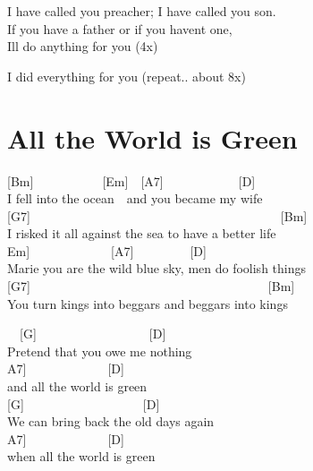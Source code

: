 \documentclass[
  letterpaper,
  a5paper]{memoir}
\begin{document}
I have called you preacher; I have called you son.\\
If you have a father or if you haven\textquotesingle t one,\\
I\textquotesingle ll do anything for you (4x)

I did everything for you (repeat.. about 8x)

\hypertarget{all-the-world-is-green}{%
\chapter{All the World is Green}\label{all-the-world-is-green}}

{[}Bm{]}~~~~~~~~~~~{[}Em{]}~~{[}A7{]}~~~~~~~~~~~~{[}D{]}\\
I fell into the ocean~~and you became my wife\\
{[}G7{]}~~~~~~~~~~~~~~~~~~~~~~~~~~~~~~~~~~~~~~~~{[}Bm{]}\\
I risked it all against the sea to have a better life\\
\hspace*{0.333em}\hspace*{0.333em}\hspace*{0.333em}\hspace*{0.333em}\hspace*{0.333em}\hspace*{0.333em}\hspace*{0.333em}\hspace*{0.333em}\hspace*{0.333em}\hspace*{0.333em}{[}Em{]}~~~~~~~~~~~~~{[}A7{]}~~~~~~~~~{[}D{]}\\
Marie you are the wild blue sky, men do foolish things\\
{[}G7{]}~~~~~~~~~~~~~~~~~~~~~~~~~~~~~~~~~~~~~~{[}Bm{]}\\
You turn kings into beggars and beggars into kings

\begin{tcolorbox}[enhanced jigsaw, breakable, bottomrule=.15mm, colframe=quarto-callout-color-frame, rightrule=.15mm, opacityback=0, colback=white, arc=.35mm, toprule=.15mm, leftrule=.75mm, left=2mm]

~~{[}G{]}~~~~~~~~~~~~~~~~~~{[}D{]}\\
Pretend that you owe me nothing~~~~~~\\
\hspace*{0.333em}\hspace*{0.333em}\hspace*{0.333em}{[}A7{]}~~~~~~~~~~~~~{[}D{]}\\
and all the world is green\\
{[}G{]}~~~~~~~~~~~~~~~~~~~{[}D{]}~~~~~~~~\\
We can bring back the old days again~~~~~\\
\hspace*{0.333em}\hspace*{0.333em}\hspace*{0.333em}\hspace*{0.333em}{[}A7{]}~~~~~~~~~~~~~{[}D{]}\\
when all the world is green

\end{tcolorbox}
\end{document}
